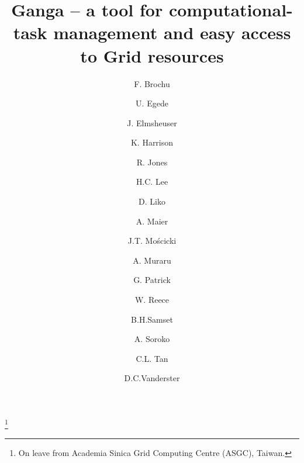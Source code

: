 \documentclass{elsart}
\def\grid {Grid\xspace}
\begin{document}
\begin{frontmatter}



\title{Ganga -- a tool for computational-task management and easy access to \grid
  resources}




\author[a:Cambridge]{F. Brochu}
\author[a:Imperial]{U. Egede}
\author[a:Munich]{J. Elmsheuser}
\author[a:Cambridge]{K. Harrison}
\author[a:Lancaster]{R. Jones}
\author[a:CERN]{H.C. Lee}
\author[a:CERN]{D. Liko}
\author[a:CERN]{A. Maier}
\author[a:CERN]{J.T. Mo{\'s}cicki}
\author[a:CERN]{A. Muraru}
\author[a:STFC]{G. Patrick}
\author[a:Imperial]{W. Reece}
\author[a:Oslo]{B.H.Samset}
\author[a:Oxford]{A. Soroko}
\author[a:Birmingham]{C.L. Tan}
\author[a:CERN]{D.C.Vanderster}

\address[a:Cambridge]{University of Cambridge, Cambridge, United Kingdom}
\address[a:Imperial]{Imperial College London, London, United Kingdom}
\address[a:Munich]{Ludwig-Maximilians-Universit\"{a}t, M\"{u}nchen, Germany}
\address[a:Lancaster]{Lancaster University, Lancaster, United Kingdom}
\address[a:CERN]{CERN, Geneva, Switzerland}
\address[a:STFC]{Science \& Technology Facilities Council, United Kingdom}
\address[a:Oxford]{University of Oxford, Oxford, United Kingdom}
\address[a:Birmingham]{University of Birmingham, Birmingham, United Kingdom}
\address[a:Oslo]{Oslo, FIXME: full address}

\thanks[HurngChun]{On leave from Academia Sinica Grid Computing Centre (ASGC),
  Taiwan.}


\end{frontmatter}
\end{document}
